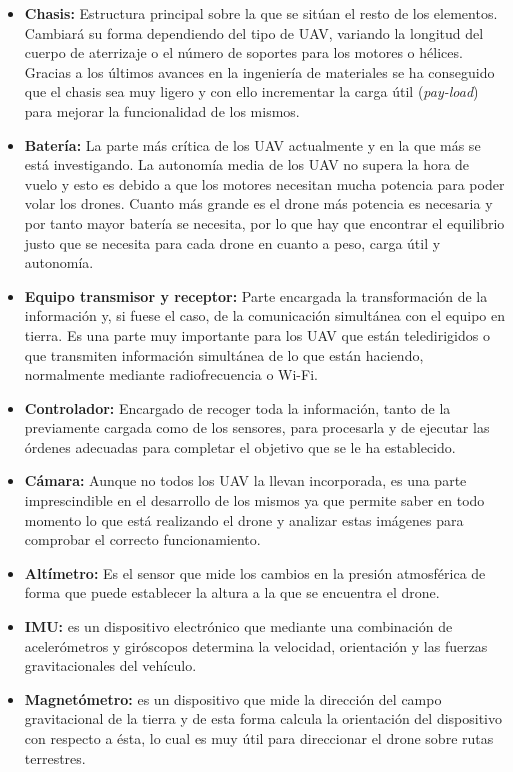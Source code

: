 \begin{itemize}
		\item \textbf{Chasis:} Estructura principal  sobre  la  que  se sitúan el resto de los elementos. Cambiará su forma dependiendo del tipo de UAV, variando la longitud del cuerpo de aterrizaje o el número de soportes para los motores o hélices. Gracias a los últimos avances en la ingeniería de materiales se ha conseguido que el chasis sea muy ligero y con ello incrementar la carga útil (\textit{pay-load}) para mejorar la funcionalidad de los mismos.
		\item \textbf{Batería:} La parte más crítica de los UAV actualmente y en la que más se está investigando. La autonomía media de los UAV no supera la hora de vuelo y esto es debido a que los motores necesitan mucha potencia para poder volar los drones. Cuanto más grande es el drone más potencia es necesaria y por tanto mayor batería se necesita, por lo que hay que encontrar el equilibrio justo que se necesita para cada drone en cuanto a peso, carga útil y autonomía. 
		\item \textbf{Equipo transmisor y receptor:} Parte encargada la transformación de la información y, si fuese el caso, de la comunicación simultánea con el equipo en tierra. Es una parte muy importante para los UAV que están teledirigidos o que transmiten información simultánea de lo que están haciendo, normalmente mediante radiofrecuencia o Wi-Fi.
		\item \textbf{Controlador:} Encargado de recoger toda la información, tanto de la previamente cargada como de los sensores, para procesarla y de ejecutar las órdenes adecuadas para completar el objetivo que se le ha establecido. 
		\item \textbf{Cámara:} Aunque no todos los UAV la llevan incorporada, es una parte imprescindible en el desarrollo de los mismos ya que permite saber en todo momento lo que está realizando el drone y analizar estas imágenes para comprobar el correcto funcionamiento.
		\item \textbf{Altímetro:} Es el sensor que mide los cambios en la presión atmosférica de forma que puede establecer la altura a la que se encuentra el drone.
		\item \textbf{IMU:} es un dispositivo electrónico que mediante una combinación de acelerómetros y giróscopos determina la velocidad, orientación y las fuerzas gravitacionales del vehículo.
		\item \textbf{Magnetómetro:} es un dispositivo que mide la dirección del campo gravitacional de la tierra y de esta forma calcula la orientación del dispositivo con respecto a ésta, lo cual es muy útil para direccionar el drone sobre rutas terrestres.
	\end{itemize}

